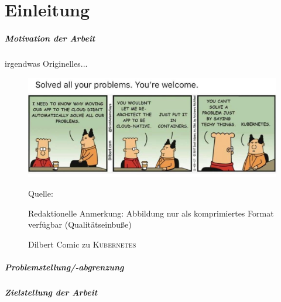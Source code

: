 \acresetall 
{} %
\chapter{Einleitung}
\paragraph{Motivation der Arbeit}
irgendwas Originelles...
\begin{figure}[H]
	\centering
	\includegraphics[scale=0.33]{img/dilbertCloud.jpeg}
	\caption{Dilbert Comic zu \textsc{Kubernetes}}
	{\footnotesize Quelle: \cite{DilbertKubernetes}\par}
	{\footnotesize Redaktionelle Anmerkung: Abbildung nur als komprimiertes Format verfügbar (Qualitätseinbuße)}
\end{figure}

\paragraph{Problemstellung/-abgrenzung}

\paragraph{Zielstellung der Arbeit}


